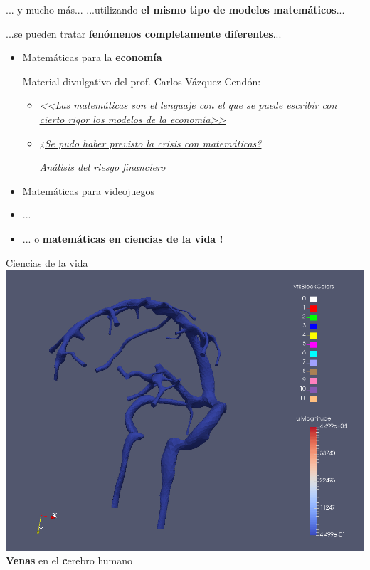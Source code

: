 \documentclass[
  unknownkeysallowed %
]{beamer}
\begin{document}
\begin{frame}{... y mucho más...}
  ...utilizando \textbf{el mismo tipo de modelos matemáticos}...
  \par\hfill ...se pueden tratar \alert{\bf fenómenos completamente diferentes}...
  \bigskip
  \begin{itemize}\itemsep1em
  \item Matemáticas para la \textbf{\alert{economía}}
    \par\bigskip
    Material divulgativo del prof. Carlos Vázquez Cendón:

    \begin{itemize}\itemsep0.5em
    \item
      \href{http://www.unir.net/empresa/revista/noticias/matematicas-para-la-economia/549201449354/}{\em
        <<Las matemáticas son el lenguaje con el que se puede escribir
        con cierto rigor los modelos de la economía>>}
    \item
      \href{http://www.rtve.es/alacarta/audios/eureka/eureka-se-pudo-haber-previsto-crisis-matematicas-31-05-13/1847482}{\em
        ¿Se pudo haber previsto la crisis con matemáticas?}
      \par\smallskip\hfill {\em Análisis del riesgo financiero}
    \end{itemize}
  \item Matemáticas para videojuegos
  \item ...
  \item ... o \textbf{\alert{matemáticas en ciencias de la vida} {\Large !}}
  \end{itemize}
\end{frame}


\begin{frame}{Ciencias de la vida}
  \includegraphics[width=0.8\linewidth]{img/brain}
  \\
  \textbf{Venas} en el \alert{\textbf cerebro humano}
\end{frame}
\end{document}

